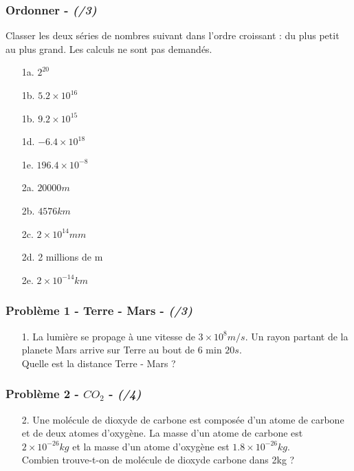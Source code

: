 \documentclass[11pt]{article}
\begin{document}
\subsubsection*{Ordonner - \textit{(/3)}}
Classer les deux séries de nombres suivant dans l'ordre croissant : du plus petit au plus grand. Les calculs ne sont pas demandés.
\begin{multicols}{2}

\begin{enumerate}
  \item[1a.] $ 2^{20} $
  \item[1b.] $ 5.2 \times 10^{16} $ 
  \item[1b.] $ 9.2 \times 10^{15} $ 
  \item[1d.] $ -6.4 \times 10^{18} $ 
  \item[1e.] $ 196.4 \times 10^{-8} $ 
\end{enumerate}
\begin{enumerate}
  \item[2a.] $ 20000 m $
  \item[2b.] $ 4576 km $ 
  \item[2c.] $ 2 \times 10^{14} mm $
  \item[2d.] 2 millions de m
  \item[2e.] $ 2 \times 10^{-14} km $
\end{enumerate}

\end{multicols}

\subsubsection*{Problème 1 - Terre - Mars  - \textit{(/3)}}
\begin{enumerate}
\item[1.] La lumière se propage à une vitesse de $3 \times 10^8 m/s$. Un rayon partant de la planete Mars arrive sur Terre au bout de $6 \text{ min } 20s$. \\
Quelle est la distance Terre - Mars ?
\end{enumerate}

\subsubsection*{Problème 2 - $CO_2$  - \textit{(/4)}}

\begin{enumerate}
  \item[2.] Une molécule de dioxyde de carbone est composée d'un atome de carbone et de deux atomes d'oxygène. La masse d'un atome de carbone est $2 \times 10^{-26}kg$ et la masse d'un atome d'oxygène est $1.8 \times 10^{-26}kg$. \\
  Combien trouve-t-on de molécule de dioxyde carbone dans 2kg ?
\end{enumerate}
\end{document}
